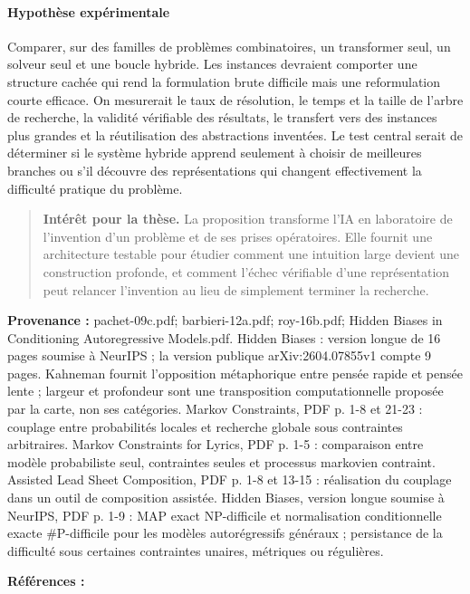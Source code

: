 \documentclass[10pt,a4paper]{article}
\begin{document}
\paragraph{Hypothèse expérimentale}
Comparer, sur des familles de problèmes combinatoires, un transformer seul, un solveur seul et une boucle hybride. Les instances devraient comporter une structure cachée qui rend la formulation brute difficile mais une reformulation courte efficace. On mesurerait le taux de résolution, le temps et la taille de l'arbre de recherche, la validité vérifiable des résultats, le transfert vers des instances plus grandes et la réutilisation des abstractions inventées. Le test central serait de déterminer si le système hybride apprend seulement à choisir de meilleures branches ou s'il découvre des représentations qui changent effectivement la difficulté pratique du problème.

\begin{quote}
\textbf{Intérêt pour la thèse.} La proposition transforme l'IA en laboratoire de l'invention d'un problème et de ses prises opératoires. Elle fournit une architecture testable pour étudier comment une intuition large devient une construction profonde, et comment l'échec vérifiable d'une représentation peut relancer l'invention au lieu de simplement terminer la recherche.
\end{quote}
{\footnotesize\color{metadata}\textbf{Provenance :} pachet-09c.pdf; barbieri-12a.pdf; roy-16b.pdf; Hidden Biases in Conditioning Autoregressive Models.pdf. Hidden Biases : version longue de 16 pages soumise à NeurIPS ; la version publique arXiv:2604.07855v1 compte 9 pages. Kahneman fournit l'opposition métaphorique entre pensée rapide et pensée lente ; largeur et profondeur sont une transposition computationnelle proposée par la carte, non ses catégories. Markov Constraints, PDF p. 1-8 et 21-23 : couplage entre probabilités locales et recherche globale sous contraintes arbitraires. Markov Constraints for Lyrics, PDF p. 1-5 : comparaison entre modèle probabiliste seul, contraintes seules et processus markovien contraint. Assisted Lead Sheet Composition, PDF p. 1-8 et 13-15 : réalisation du couplage dans un outil de composition assistée. Hidden Biases, version longue soumise à NeurIPS, PDF p. 1-9 : MAP exact NP-difficile et normalisation conditionnelle exacte \#P-difficile pour les modèles autorégressifs généraux ; persistance de la difficulté sous certaines contraintes unaires, métriques ou régulières.\par}
{\footnotesize\color{metadata}\textbf{Références :} \parencite{kahneman2011thinking,pachet2011markov,barbieri2012lyrics,papadopoulos2016flowcomposer,pachet2026biases}\par}
\end{document}
